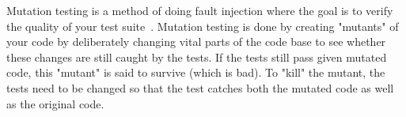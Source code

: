 Mutation testing is a method of doing fault injection where the goal is to verify the quality of your test suite~\citep{papadakis2019mutation}. Mutation testing is done by creating "mutants" of your code by deliberately changing vital parts of the code base to see whether these changes are still caught by the tests.
If the tests still pass given mutated code, this "mutant" is said to survive (which is bad). To "kill" the mutant, the tests need to be changed so that the test catches both the mutated code as well as the original code.

